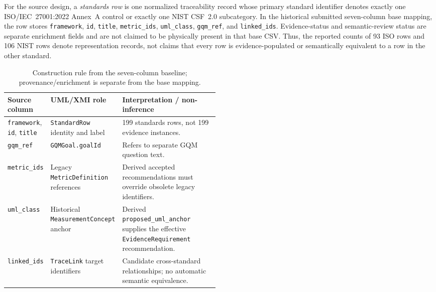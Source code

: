 \documentclass[12pt,a4paper]{article}
\begin{document}
For the source design, a \emph{standards row} is one normalized traceability record whose primary standard identifier denotes exactly one ISO/IEC~27001:2022 Annex~A control or exactly one NIST CSF~2.0 subcategory. In the historical submitted seven-column base mapping, the row stores \texttt{framework}, \texttt{id}, \texttt{title}, \texttt{metric\_ids}, \texttt{uml\_class}, \texttt{gqm\_ref}, and \texttt{linked\_ids}. Evidence-status and semantic-review status are separate enrichment fields and are not claimed to be physically present in that base CSV. Thus, the reported counts of 93 ISO rows and 106 NIST rows denote representation records, not claims that every row is evidence-populated or semantically equivalent to a row in the other standard.


\begin{table}[tbp]\centering\scriptsize
\caption{Construction rule from the seven-column baseline; provenance/enrichment is separate from the base mapping.}\label{tab:seven-col-construction}
\begin{tabularx}{\linewidth}{@{}p{0.19\linewidth}p{0.30\linewidth}Y@{}}\toprule
Source column & UML/XMI role & Interpretation / non-inference \\\midrule
\texttt{framework}, \texttt{id}, \texttt{title} & \texttt{StandardRow} identity and label & 199 standards rows, not 199 evidence instances. \\
\texttt{gqm\_ref} & \texttt{GQMGoal.goalId} & Refers to separate GQM question text. \\
\texttt{metric\_ids} & Legacy \texttt{MetricDefinition} references & Derived accepted recommendations must override obsolete legacy identifiers. \\
\texttt{uml\_class} & Historical \texttt{MeasurementConcept} anchor & Derived \texttt{proposed\_uml\_anchor} supplies the effective \texttt{EvidenceRequirement} recommendation. \\
\texttt{linked\_ids} & \texttt{TraceLink} target identifiers & Candidate cross-standard relationships; no automatic semantic equivalence. \\
\bottomrule\end{tabularx}
\end{table}
\end{document}
